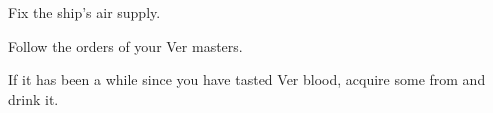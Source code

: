 \documentclass[blue]{guildcamp4}
\begin{document}
\begin{itemz}[Goals]
	\item Fix the ship's air supply.
	\item Follow the orders of your Ver masters.
	\item If it has been a while since you have tasted Ver blood, acquire some from \cVone{} and drink it.
\end{itemz}

\begin{members}
	\member{\cJoan{}} 
	\member{\cJulie{}} 
	\member{\cJames{}} 
	\member{\cRasputin{}} 
\end{members}
\end{document}
